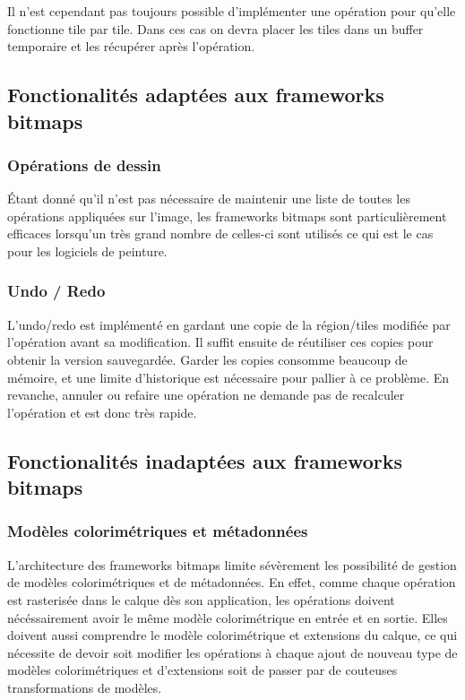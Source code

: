 			Il n'est cependant pas toujours possible d'implémenter une opération pour qu'elle fonctionne tile par tile. Dans ces cas on devra placer
			les tiles dans un buffer temporaire et les récupérer après l'opération. 

		\subsection{Fonctionalités adaptées aux frameworks bitmaps}
			\subsubsection{Opérations de dessin}
				Étant donné qu'il n'est pas nécessaire de maintenir une liste de toutes les opérations appliquées sur l'image, les frameworks
				bitmaps sont particulièrement efficaces lorsqu'un très grand nombre de celles-ci sont utilisés ce qui est le cas pour les
				logiciels de peinture. 
			\subsubsection{Undo / Redo}
				L'undo/redo est implémenté en gardant une copie de la région/tiles modifiée par l'opération avant sa modification. 
				Il suffit ensuite de réutiliser ces copies pour obtenir la version sauvegardée. Garder les copies consomme beaucoup de mémoire,
				et une limite d'historique est nécessaire pour pallier à ce problème. En revanche, annuler ou refaire une opération ne demande
				pas de recalculer l'opération et est donc très rapide.
		\subsection{Fonctionalités inadaptées aux frameworks bitmaps}
			\subsubsection{Modèles colorimétriques et métadonnées}
				L'architecture des frameworks bitmaps limite sévèrement les possibilité de gestion de modèles colorimétriques et de métadonnées.
				En effet, comme chaque opération est rasterisée dans le calque dès son application, les opérations doivent nécéssairement 
				avoir le même modèle colorimétrique en entrée et en sortie. Elles doivent aussi comprendre le modèle colorimétrique et extensions du 
				calque, ce qui nécessite de devoir soit modifier les opérations à chaque ajout de nouveau type de modèles colorimétriques et d'extensions
				soit de passer par de couteuses transformations de modèles.

